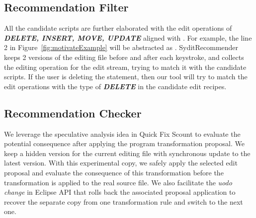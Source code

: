 \subsection {Recommendation Filter}\label{sec:filter}
All the candidate scripts are further elaborated with the edit operations of \textit{\textbf{DELETE, INSERT, MOVE, UPDATE}} aligned with \cite{meng:sydit}. For example, the line 2 in Figure~\ref{fig:motivateExample} will be abstracted as  . SyditRecommender keeps 2 versions of the editing file before and after each keystroke, and collects the editing operation for the edit stream, trying to match it with the candidate scripts. If the user is deleting the statement, then our tool will try to match the edit operations with the type of \textit{\textbf{DELETE}} in the candidate edit recipes. 

\subsection {Recommendation Checker}\label{sec:checker}
We leverage the speculative analysis idea in Quick Fix Scount \cite{muslu:scout} to evaluate the potential consequence after applying the program transformation proposal. We keep a hidden version for the current editing file with synchronous update to the latest version. With this experimental copy, we safely apply the selected edit proposal and evaluate the consequence of this transformation before the transformation is applied to the real source file. We also facilitate the \textit{uodo change} in Eclipse API that rolls back the associated proposal application to recover the separate copy from one transformation rule and switch to the next one.    

